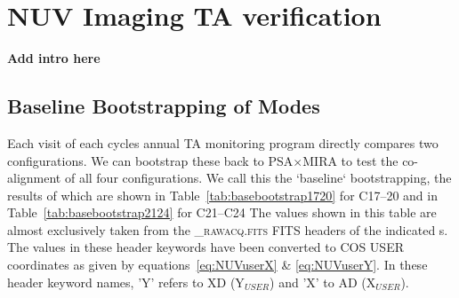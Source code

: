 \section{NUV Imaging TA verification}\label{sec:NimVER}

{\bf Add intro here}

%

\subsection{Baseline Bootstrapping of  Modes}\label{subsec:basebootstrap}

Each visit of each cycles annual TA monitoring program directly compares two  configurations.
We can bootstrap these back to PSA$\times$MIRA to test the co-alignment of all four configurations.
We call this the `baseline` bootstrapping, the results of which are shown in Table~\ref{tab:basebootstrap1720}
for C17--20 and in Table~\ref{tab:basebootstrap2124} for C21--C24
The values shown in this table are almost exclusively taken from the \textsc{\_rawacq.fits} FITS
headers of the indicated s. The values in these header keywords have been converted to
COS USER coordinates as given by equations~\ref{eq:NUVuserX} \& \ref{eq:NUVuserY}. In these header keyword names, 'Y' refers to XD (Y$_{USER}$) and 'X' to AD (X$_{USER}$).\\

